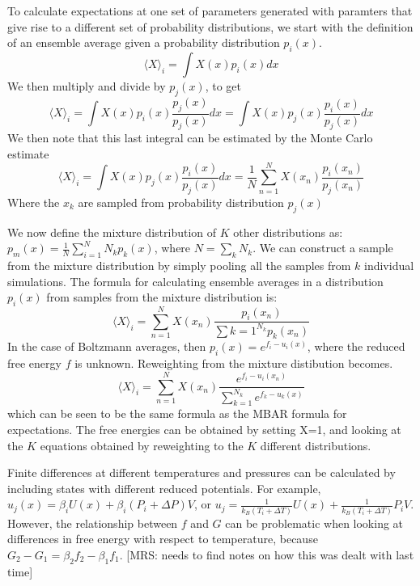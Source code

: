 \documentclass[a4paper,12pt]{article}
\begin{document}
To calculate expectations at one set of parameters generated with
paramters that give rise to a different set of probability
distributions, we start with the definition of an ensemble average
given a probability distribution $p_i(x)$. 
\begin{equation}
\langle X \rangle_i = \int X(x) p_i(x) dx 
\end{equation}
We then multiply and divide by $p_j(x)$, to get
\begin{equation}
\langle X \rangle_i = \int X(x) p_i(x) \frac{p_j(x)}{p_j(x)}dx = \int X(x) p_j(x) \frac{p_i(x)}{p_j(x)}dx 
\end{equation}
We then note that this last integral can be estimated by the Monte Carlo estimate
\begin{equation}
\langle X \rangle_i = \int X(x) p_j(x) \frac{p_i(x)}{p_j(x)}dx = \frac{1}{N}\sum_{n=1}^N X(x_n) \frac{p_i(x_n)}{p_j(x_n)}
\end{equation}
Where the $x_k$ are sampled from probability distribution $p_j(x)$

We now define the mixture distribution of $K$ other distributions as:
$p_m(x) = \frac{1}{N} \sum_{i=1}^N N_k p_k(x)$, where $N = \sum_k
N_k$.  We can construct a sample from the mixture distribution by
simply pooling all the samples from $k$ individual simulations.
The formula for calculating ensemble averages in a distribution $p_i(x)$
from samples from the mixture distribution is:
\begin{equation}
\langle X \rangle_i = \sum_{n=1}^N X(x_n) \frac{p_i(x_n)}{\sum{k=1}^{N_k} p_k(x_n)}
\end{equation}
In the case of Boltzmann averages, then $p_i(x) = e^{f_i-u_i(x)}$, where
the reduced free energy $f$ is unknown.  Reweighting from the mixture
distibution becomes.
\begin{equation}
\langle X \rangle_i = \sum_{n=1}^N X(x_n) \frac{e^{f_i - u_i(x_n)}}{\sum_{k=1}^{N_k} e^{f_k - u_k(x)}}
\end{equation}
which can be seen to be the same formula as the MBAR formula for
expectations. The free energies can be obtained by setting X=1, and
looking at the $K$ equations obtained by reweighting to the $K$
different distributions. 

Finite differences at different temperatures and pressures can be
calculated by including states with different reduced potentials. For
example, $u_j(x) = \beta_i U(x) + \beta_i (P_i + \Delta P) V$, or $u_j
= \frac{1}{k_B(T_i + \Delta T)} U(x) + \frac{1}{k_B(T_i + \Delta T)}
P_i V$. However, the relationship between $f$ and $G$ can be
problematic when looking at differences in free energy with respect to
temperature, because $G_2 - G_1 = \beta_2 f_2 - \beta_1 f_1$.  
[MRS: needs to find notes on how this was dealt with last time]
\end{document}
